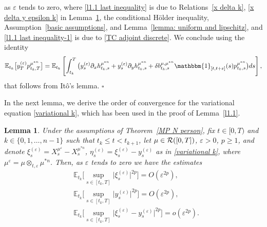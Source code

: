 \documentclass[12pt]{article}
\newtheorem{lemma}[prop]{Lemma}
\theoremstyle{named}
\numberwithin{equation}{section}
\newcommand{\abs}[1]{\lvert#1\rvert}
\newenvironment{Proof}{\removelastskip\par\medskip \noindent{\em Proof.} \rm}{\penalty-20\null\hfill$\square$\par\medbreak}
\begin{document}
\begin{Proof}
 as $\varepsilon$ tends to zero,
 where \eqref{l1.1 last inequality} is due to
 Relations~\eqref{x delta k}, \eqref{x delta y epsilon k} in Lemma~\ref{l1},
 the conditional H\"older inequality, Assumption~\ref{basic assumptions},
 and Lemma~\ref{lemma: uniform and lipschitz},
 and \eqref{l1.1 last inequality-1} is due to \eqref{TC adjoint discrete}.
 We conclude using the identity
$$
  \mathbb{E}_{t_k } \big[y^{(\varepsilon)}_T p^{\mu^{*n} }_{t_k ,T} \big] = \mathbb{E}_{t_k } \left[\int_{t_k }^T \big(y^{(\varepsilon)}_s \partial_xh^{\mu^{*n} }_{t_k ,s} + y^{(\varepsilon)}_s\partial_yh^{\mu^{*n} }_{t_k ,s}
  + \delta b^{\mu,\mu^{*n} }_{t_k ,s}\mathbbm{1}_{[t,t+\varepsilon]}(s) p^{\mu^{*n} }_{t_k ,s}\big) ds\right],
  $$
 that follows from It\^o's lemma.
\end{Proof}
\noindent
In the next lemma, we derive the order of convergence for the variational equation
\eqref{variational k}, which has been used in the proof of Lemma~\ref{l1.1}.
\begin{lemma}
  \label{l1}
  Under the assumptions of Theorem~\ref{MP N person},
  fix $t \in [0,T)$ and $k \in \{0, 1, \dots, {n}-1\}$ such that $t_k \leq t < t_{k+1}$,
    let $\mu \in {\cal R}([0,T])$, $\varepsilon > 0$, $p \geq 1$,
    and denote
 $\xi^{(\varepsilon)}_s = X^{\mu^\varepsilon}_s - X^{\mu^{*n}}_s$,
$\eta^{(\varepsilon)}_s = \xi^{(\varepsilon)}_s - y^{(\varepsilon)}_s$
    as in \eqref{variational k},
    where
    $\mu^\varepsilon = \mu \otimes_{t,\varepsilon} \mu^{*n}$.
    Then, as $\varepsilon$ tends to zero we have the estimates
\begin{align}
  & \mathbb{E}_{t_k}\biggl[\sup\limits_{s \in [t_k,T]}
    \big| \xi^{(\varepsilon)}_s\big|^{2p}\biggr] = O(\varepsilon^{2p}), \label{x delta k}\\
  &
   \mathbb{E}_{t_k}\biggl[\sup\limits_{s \in [t_k,T]} \abs{y^{(\varepsilon)}_s}^{2p}\biggr] = O(\varepsilon^{2p}), \label{y epsilon k}\\
  &
 \mathbb{E}_{t_k}\biggl[\sup\limits_{s \in [t_k,T]} \abs{\xi^{(\varepsilon)}_s - y^{(\varepsilon)}_s}^{2p}\biggr] = o(\varepsilon^{2p}). \label{x delta y epsilon k}
\end{align}
\end{lemma}
\end{document}
